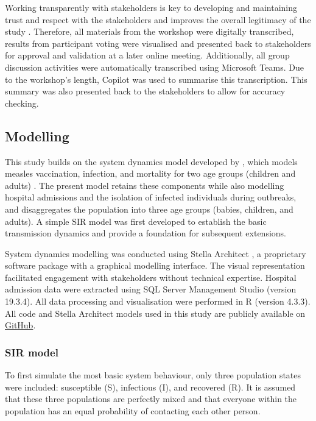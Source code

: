 \documentclass[12pt]{article}
\begin{document}
Working transparently with stakeholders is key to developing and maintaining trust and respect with the stakeholders and improves the overall legitimacy of the study \cite{ray2017strengthening}. Therefore, all materials from the workshop were digitally transcribed, results from participant voting were visualised and presented back to stakeholders for approval and validation at a later online meeting. Additionally, all group discussion activities were automatically transcribed using Microsoft Teams. Due to the workshop's length, Copilot was used to summarise this transcription. This summary was also presented back to the stakeholders to allow for accuracy checking. 

\subsection{Modelling}

This study builds on the system dynamics model developed by \citeauthor{van2020explaining}, which models measles vaccination, infection, and mortality for two age groups (children and adults) \cite{van2020explaining}. The present model retains these components while also modelling hospital admissions and the isolation of infected individuals during outbreaks, and disaggregates the population into three age groups (babies, children, and adults). A simple SIR model was first developed to establish the basic transmission dynamics and provide a foundation for subsequent extensions.

System dynamics modelling was conducted using Stella Architect \cite{StellaArchitect}, a proprietary software package with a graphical modelling interface. The visual representation facilitated engagement with stakeholders without technical expertise. Hospital admission data were extracted using SQL Server Management Studio (version 19.3.4). All data processing and visualisation were performed in R (version 4.3.3). All code and Stella Architect models used in this study are publicly available on \href{https://github.com/David-Ellis/Measles-System-Dynamics-BSol}{GitHub}.

\subsubsection{SIR model}
\label{sec:sir}

To first simulate the most basic system behaviour, only three population states were included: susceptible (S), infectious (I), and recovered (R). It is assumed that these three populations are perfectly mixed and that everyone within the population has an equal probability of contacting each other person.
\end{document}
